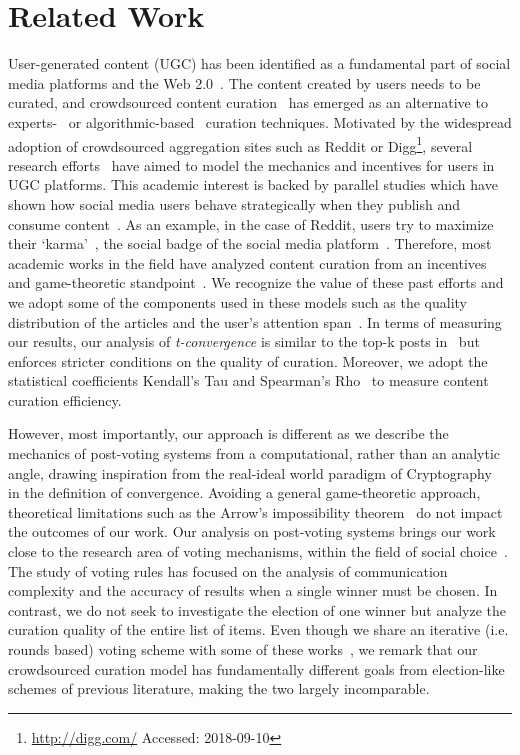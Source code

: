 \section{Related Work}
  User-generated content (UGC) has been identified as a fundamental part of social media platforms and the Web 2.0~\cite{kaplan2010users}. The content created by users needs to be curated, and crowdsourced content curation~\cite{askalidis2013theoretical} has emerged as an alternative to experts-~\cite{stanoevska2012content} or algorithmic-based~\cite{rader2015understanding} curation techniques. Motivated by the widespread adoption of crowdsourced aggregation sites such as Reddit or Digg\footnote{\url{http://digg.com/} Accessed: 2018-09-10}, several research efforts~\cite{das2010ranking,ghosh2011incentivizing} have aimed to model the mechanics and incentives for users in UGC platforms. This academic interest is backed by parallel studies which have shown how
social media users behave strategically when they publish and consume content~\cite{may2014filter}. As an example, in the case of Reddit, users try to maximize their `karma'~\cite{bergstrom2011don}, the social badge of the social media platform~\cite{anderson2013steering}.
   Therefore, most academic works in the field have analyzed content curation from an incentives and game-theoretic standpoint~\cite{ghosh2011incentivizing,das2010ranking,gupte2009news,may2014filter}. We recognize the value of these past efforts and we adopt some of the components used in these models such as the quality distribution of the articles and the user's attention span~\cite{askalidis2013theoretical,ghosh2011incentivizing}. In terms of measuring our results,  our analysis of \textit{t-convergence} is similar to the top-k posts in~\cite{askalidis2013theoretical} but enforces stricter conditions on the quality of curation. Moreover, we adopt the statistical coefficients Kendall's Tau and Spearman's Rho~\cite{xu2013comparative,yue2002power} to measure content curation efficiency.
   

    However, most importantly, our approach is different as we describe the mechanics of post-voting systems from a computational, rather than an analytic angle, drawing inspiration from the real-ideal world paradigm of Cryptography~\cite{lindell} in the definition of convergence. Avoiding a general game-theoretic approach, theoretical limitations such as the Arrow's impossibility theorem~\cite{arrow1950difficulty} do not impact the outcomes of our work.
    Our analysis on post-voting systems brings our work close to the research area of voting mechanisms, within the field of social choice~\cite{lu2011robust,conitzer2005communication,xia2010compilation}. The study of voting rules has focused on the analysis of communication complexity and the accuracy of results when a single winner must be chosen. In contrast, we do not seek to investigate the election of one winner but analyze the curation quality of the entire list of items. Even though we share an iterative (i.e. rounds based) voting scheme with some of these works~\cite{kalech2011practical}, we remark that our crowdsourced curation model has fundamentally different goals from election-like schemes of previous literature, making the two largely incomparable.

